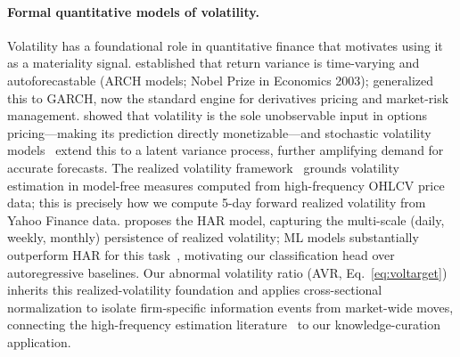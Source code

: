 \documentclass{article}
\begin{document}
\paragraph{Formal quantitative models of volatility.}
Volatility has a foundational role in quantitative finance that motivates using it as a materiality signal.
\citet{engle1982arch} established that return variance is time-varying and autoforecastable (ARCH models; Nobel Prize in Economics 2003); \citet{bollerslev1986garch} generalized this to GARCH, now the standard engine for derivatives pricing and market-risk management.
\citet{blackscholes1973} showed that volatility is the sole unobservable input in options pricing---making its prediction directly monetizable---and stochastic volatility models~\citep{heston1993stochastic} extend this to a latent variance process, further amplifying demand for accurate forecasts.
The realized volatility framework~\citep{andersenbollerslev1998, barndorffshephard2002} grounds volatility estimation in model-free measures computed from high-frequency OHLCV price data; this is precisely how we compute 5-day forward realized volatility from Yahoo Finance data.
\citet{corsi2009har} proposes the HAR model, capturing the multi-scale (daily, weekly, monthly) persistence of realized volatility; ML models substantially outperform HAR for this task~\citep{christensen2023ml}, motivating our classification head over autoregressive baselines.
Our abnormal volatility ratio (AVR, Eq.~\ref{eq:voltarget}) inherits this realized-volatility foundation and applies cross-sectional normalization to isolate firm-specific information events from market-wide moves, connecting the high-frequency estimation literature~\citep{boudoukh2019firm} to our knowledge-curation application.
\end{document}
